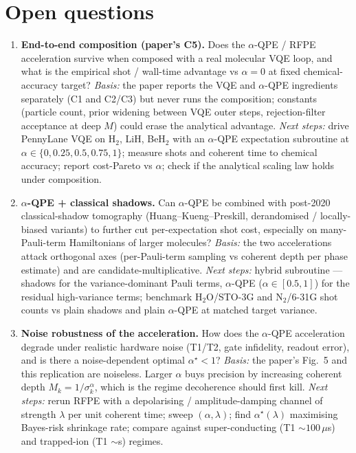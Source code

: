\section{Open questions}

\begin{enumerate}
\item \textbf{End-to-end composition (paper's C5).} Does the $\alpha$-QPE / RFPE
acceleration survive when composed with a real molecular VQE loop, and what is
the empirical shot / wall-time advantage vs $\alpha{=}0$ at fixed
chemical-accuracy target? \textit{Basis:} the paper reports the VQE and
$\alpha$-QPE ingredients separately (C1 and C2/C3) but never runs the
composition; constants (particle count, prior widening between VQE outer steps,
rejection-filter acceptance at deep $M$) could erase the analytical advantage.
\textit{Next steps:} drive PennyLane VQE on H$_2$, LiH, BeH$_2$ with an
$\alpha$-QPE expectation subroutine at $\alpha\in\{0,0.25,0.5,0.75,1\}$;
measure shots and coherent time to chemical accuracy; report cost-Pareto vs
$\alpha$; check if the analytical scaling law holds under composition.

\item \textbf{$\alpha$-QPE + classical shadows.} Can $\alpha$-QPE be combined
with post-2020 classical-shadow tomography (Huang--Kueng--Preskill,
derandomised / locally-biased variants) to further cut per-expectation shot
cost, especially on many-Pauli-term Hamiltonians of larger molecules?
\textit{Basis:} the two accelerations attack orthogonal axes (per-Pauli-term
sampling vs coherent depth per phase estimate) and are candidate-multiplicative.
\textit{Next steps:} hybrid subroutine --- shadows for the variance-dominant
Pauli terms, $\alpha$-QPE ($\alpha \in [0.5, 1]$) for the residual
high-variance terms; benchmark H$_2$O/STO-3G and N$_2$/6-31G shot counts
vs plain shadows and plain $\alpha$-QPE at matched target variance.

\item \textbf{Noise robustness of the acceleration.} How does the $\alpha$-QPE
acceleration degrade under realistic hardware noise (T1/T2, gate infidelity,
readout error), and is there a noise-dependent optimal $\alpha^\star < 1$?
\textit{Basis:} the paper's Fig.~5 and this replication are noiseless. Larger
$\alpha$ buys precision by increasing coherent depth $M_k = 1/\sigma_k^\alpha$,
which is the regime decoherence should first kill.
\textit{Next steps:} rerun RFPE with a depolarising / amplitude-damping channel
of strength $\lambda$ per unit coherent time; sweep $(\alpha, \lambda)$; find
$\alpha^\star(\lambda)$ maximising Bayes-risk shrinkage rate; compare against
super-conducting (T1 $\sim100\,\mu$s) and trapped-ion (T1 $\sim$s) regimes.


\end{enumerate}

